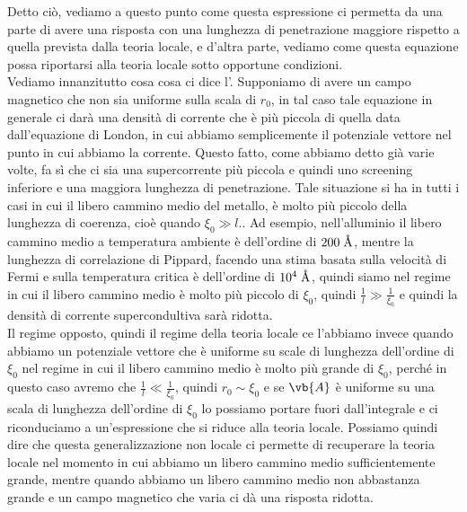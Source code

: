 Detto ciò, vediamo a questo punto come questa espressione ci permetta da una parte di avere una risposta con una lunghezza di penetrazione maggiore rispetto a quella prevista dalla teoria locale, e d'altra parte, vediamo come questa equazione possa riportarsi alla teoria locale sotto opportune condizioni.\\
Vediamo innanzitutto cosa cosa ci dice l'. Supponiamo di avere un campo magnetico che non sia uniforme sulla scala di $r_0$, in tal caso tale equazione in generale ci darà una densità di corrente che è più piccola di quella data dall'equazione di London, in cui abbiamo semplicemente il potenziale vettore nel punto in cui abbiamo la corrente. Questo fatto, come abbiamo detto già varie volte, fa sì che ci sia una supercorrente più piccola e quindi uno screening inferiore e una maggiora lunghezza di penetrazione. Tale situazione si ha in tutti i casi in cui il libero cammino medio del metallo, è molto più piccolo della lunghezza di coerenza, cioè quando $\xi_0 \gg l$.. Ad esempio, nell'alluminio il libero cammino medio a temperatura ambiente è dell'ordine di $200 \; \A$, mentre la lunghezza di correlazione di Pippard, facendo una stima basata sulla velocità di Fermi e sulla temperatura critica è dell'ordine di $10^4 \; \A$, quindi siamo nel regime in cui il libero cammino medio è molto più piccolo di $\xi_0$, quindi $\frac{1}{l} \gg \frac{1}{\xi_0}$ e quindi la densità di corrente supercondultiva sarà ridotta.\\
Il regime opposto, quindi il regime della teoria locale ce l'abbiamo invece quando abbiamo un potenziale vettore che è uniforme su scale di lunghezza dell'ordine di $\xi_0$ nel regime in cui il libero cammino medio è molto più grande di $\xi_0$, perché in questo caso avremo che $\frac{1}{l} \ll \frac{1}{\xi_0}$, quindi $r_0 \sim \xi_0$ e se $\vb{A}$ è uniforme su una scala di lunghezza dell'ordine di $\xi_0$ lo possiamo portare fuori dall'integrale e ci riconduciamo a un'espressione che si  riduce alla teoria locale. Possiamo quindi dire che questa generalizzazione non locale ci permette di recuperare la teoria locale nel momento in cui abbiamo un libero cammino medio sufficientemente grande, mentre quando abbiamo un libero cammino medio non abbastanza grande e un campo magnetico che varia ci dà una risposta ridotta.\\
